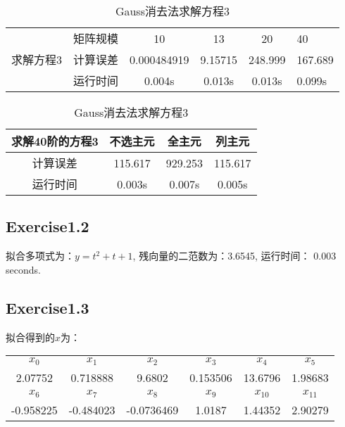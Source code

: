 \documentclass{article}
\begin{document}
\begin{table}[H]
	\begin{table}[H]
		\centering
		\begin{tabular}{cccccl}
			\hline
			\multirow{3}{*}{求解方程3} & 矩阵规模 & 10          & 13      & 20      & 40      \\ \cline{2-6} 
			& 计算误差 & 0.000484919 & 9.15715 & 248.999 & 167.689 \\
			& 运行时间 & 0.004s      & 0.013s  & 0.013s  & 0.099s  \\ \hline
		\end{tabular}
		\caption{QR分解求解方程3}
		\label{tab:my-table}
	\end{table}
	
	\begin{table}[H]
		\centering
		\begin{tabular}{cccc}
			\hline
			求解40阶的方程3 & 不选主元    & 全主元     & 列主元     \\ \hline
			计算误差      & 115.617 & 929.253 & 115.617 \\
			运行时间      & 0.003s  & 0.007s  & 0.005s  \\ \hline
		\end{tabular}
		\caption{Gauss消去法求解方程3}
		\label{tab:my-table}
	\end{table}
	
\end{table}

\subsection*{Exercise1.2}

拟合多项式为：$y = t^2 + t + 1$, 残向量的二范数为：3.6545, 运行时间： 0.003 seconds.

\subsection*{Exercise1.3}

拟合得到的$x$为：

\begin{center}
	\begin{tabular}{|*{6}{c|}}
		\hline
		$x_0$ & $x_1$ & $x_2$ & $x_3$ & $x_4$ & $x_5$ \\
		2.07752 & 0.718888 & 9.6802 & 0.153506 & 13.6796 & 1.98683 \\
		\hline
		$x_6$ & $x_7$ & $x_8$ & $x_9$ & $x_{10}$ & $x_{11}$ \\%
		-0.958225 & -0.484023 & -0.0736469 & 1.0187 & 1.44352 & 2.90279 \\
		\hline
	\end{tabular}
\end{center}
\end{document}
